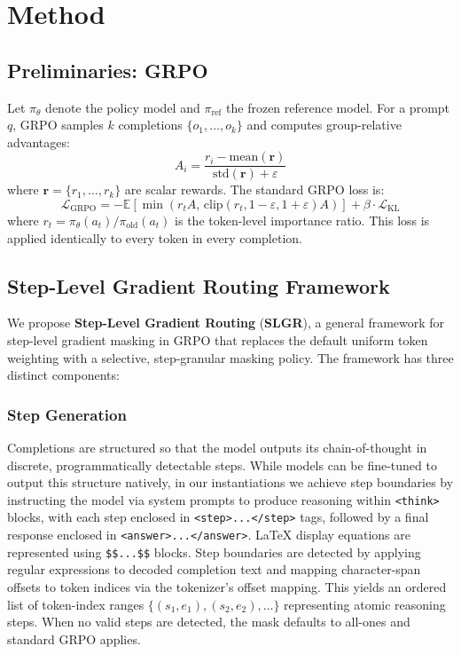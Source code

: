 \documentclass{article}
\begin{document}
\section{Method}

\subsection{Preliminaries: GRPO}

Let $\pi_\theta$ denote the policy model and $\pi_\text{ref}$ the frozen reference model. For a prompt $q$, GRPO samples $k$ completions $\{o_1, \ldots, o_k\}$ and computes group-relative advantages:
\begin{equation}
A_i = \frac{r_i - \text{mean}(\mathbf{r})}{\text{std}(\mathbf{r}) + \varepsilon}
\label{eq:advantage}
\end{equation}
where $\mathbf{r} = \{r_1, \ldots, r_k\}$ are scalar rewards. The standard GRPO loss is:
\begin{equation}
\mathcal{L}_\text{GRPO} = -\mathbb{E}\!\left[\min\!\left(r_t A, \,\text{clip}(r_t, 1{-}\varepsilon, 1{+}\varepsilon) A\right)\right] + \beta \cdot \mathcal{L}_\text{KL}
\label{eq:grpo}
\end{equation}
where $r_t = \pi_\theta(a_t) / \pi_\text{old}(a_t)$ is the token-level importance ratio. This loss is applied identically to every token in every completion.

\subsection{Step-Level Gradient Routing Framework}

We propose \textbf{Step-Level Gradient Routing} (\textbf{SLGR}), a general framework for step-level gradient masking in GRPO that replaces the default uniform token weighting with a selective, step-granular masking policy. The framework has three distinct components:

\subsubsection{Step Generation}

Completions are structured so that the model outputs its chain-of-thought in discrete, programmatically detectable steps. While models can be fine-tuned to output this structure natively, in our instantiations we achieve step boundaries by instructing the model via system prompts to produce reasoning within \texttt{<think>} blocks, with each step enclosed in \texttt{<step>...</step>} tags, followed by a final response enclosed in \texttt{<answer>...</answer>}. LaTeX display equations are represented using \texttt{\$\$...\$\$} blocks. Step boundaries are detected by applying regular expressions to decoded completion text and mapping character-span offsets to token indices via the tokenizer's offset mapping. This yields an ordered list of token-index ranges $\{(s_1, e_1), (s_2, e_2), \ldots\}$ representing atomic reasoning steps. When no valid steps are detected, the mask defaults to all-ones and standard GRPO applies.
\end{document}
